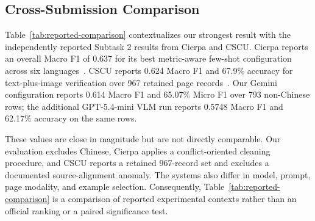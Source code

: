 \documentclass[sigconf,article]{acmart}
\begin{document}
\begin{table}[!t]
\caption{Task 2 Single-Page Metric Verification: Language-Level Micro F1 and Macro F1 for English, French, Japanese, Korean, and Thai.}
\label{tab:lang}
\centering
\scriptsize
{}
\end{table}

\subsection{Cross-Submission Comparison}
Table~\ref{tab:reported-comparison} contextualizes our strongest result with the independently reported Subtask 2 results from Cierpa and CSCU. Cierpa reports an overall Macro F1 of 0.637 for its best metric-aware few-shot configuration across six languages~\cite{endo2026cierpa}. CSCU reports 0.624 Macro F1 and 67.9\% accuracy for text-plus-image verification over 967 retained page records~\cite{boonsuriyatham2026cscu}. Our Gemini configuration reports 0.614 Macro F1 and 65.07\% Micro F1 over 793 non-Chinese rows; the additional GPT-5.4-mini VLM run reports 0.5748 Macro F1 and 62.17\% accuracy on the same rows.

These values are close in magnitude but are not directly comparable. Our evaluation excludes Chinese, Cierpa applies a conflict-oriented cleaning procedure, and CSCU reports a retained 967-record set and excludes a documented source-alignment anomaly. The systems also differ in model, prompt, page modality, and example selection. Consequently, Table~\ref{tab:reported-comparison} is a comparison of reported experimental contexts rather than an official ranking or a paired significance test.
\end{document}
